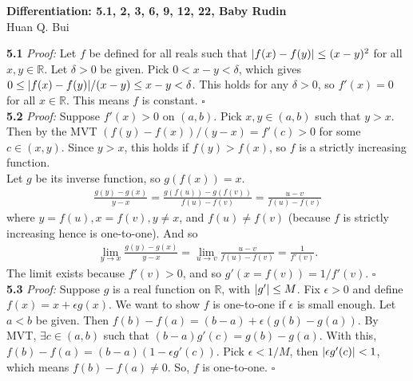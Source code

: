 \documentclass[11pt]{article}
\begin{document}
\begin{center}
{\Large\bf  Differentiation:  5.1, 2, 3, 6, 9, 12, 22, Baby Rudin}\\
$\,$\\
{\Large  Huan Q. Bui}
\end{center}




\noindent \textbf{5.1}
\noindent \textit{Proof:}  Let $f$ be defined for all reals such that $\abs{f(x) - f(y)} \leq (x-y)^2$ for all $x,y \in \mathbb{R}$. Let $\delta > 0$ be given. Pick $0 < x - y < \delta$,  which gives $0 \leq \abs{f(x) - f(y)}/(x-y) \leq x-y < \delta$.  This holds for any $\delta > 0$, so $f'(x) = 0$ for all $x \in \mathbb{R}$. This means $f$ is constant. \hfill $\square$\\


\noindent \textbf{5.2}
\noindent \textit{Proof:} Suppose $f'(x) > 0$ on $(a,b)$. Pick $x,y \in (a,b)$ such that $y > x$. Then by the MVT $(f(y) - f(x)) / (y-x) = f'(c) > 0$ for some $c \in (x,y)$. Since $y>x$, this holds if $f(y) > f(x)$, so $f$ is a strictly increasing function.\\

\noindent Let $g$ be its inverse function, so $g(f(x)) = x$. 
\begin{align*}
\frac{g(y) - g(x)}{y-x} = \frac{g(f(u)) - g(f(v))}{f(u) - f(v)} = \frac{u-v}{f(u) - f(v)}
\end{align*} 
where $y = f(u), x = f(v), y\neq x$, and $f(u) \neq f(v)$ (because $f$ is strictly increasing hence is one-to-one). And so
\begin{align}
\lim_{y\to x} \frac{g(y) - g(x)}{y-x} = \lim_{u\to v}\frac{u-v}{f(u) - f(v)} = \frac{1}{f'(v)}.
\end{align}
The limit exists because $f'(v) > 0$, and so $g'(x = f(v)) = 1/f'(v)$.   \hfill $\square$\\ 





\noindent \textbf{5.3}
\noindent \textit{Proof:}  Suppose $g$ is a real function on $\mathbb{R}$, with $\abs{g'} \leq M$. Fix $\epsilon >0$ and define $f(x) = x + \epsilon g(x) $. We want to show $f$ is one-to-one if $\epsilon$ is small enough. Let $a< b$ be given. Then $f(b) - f(a) = (b-a) + \epsilon (g(b) - g(a))$. By MVT, $\exists c \in (a,b)$ such that $(b-a)g'(c) = g(b) - g(a)$. With this, $f(b) - f(a) = (b-a)(1 - \epsilon g'(c))$. Pick $\epsilon < 1/M$, then $\abs{\epsilon g'(c)} < 1$, which means $f(b) - f(a) \neq 0$. So, $f$ is one-to-one. \hfill $\square$\\
\end{document}

